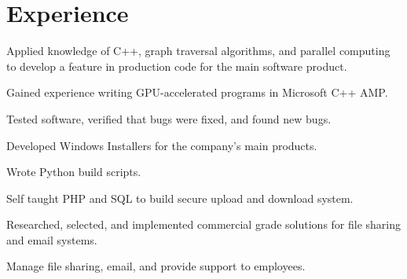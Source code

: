 \documentclass[letterpaper]{deedy-resume} %
\begin{document}
\begin{minipage}[t]{0.66\textwidth} %


\section{Experience}


\vspace{\topsep} %
\begin{tightitemize}
\item Applied knowledge of C++, graph traversal algorithms, and parallel
  computing to develop a feature in production code for the main software
  product.
\item Gained experience writing GPU-accelerated programs in Microsoft C++ AMP.
\item Tested software, verified that bugs were fixed, and found new bugs.
\item Developed Windows Installers for the company's main products.
\item Wrote Python build scripts.
\end{tightitemize}

\sectionspace %



\begin{tightitemize}
\item Self taught PHP and SQL to build secure upload and download system.
\item Researched, selected, and implemented commercial grade solutions
  for file sharing and email systems.
\item Manage file sharing, email, and provide support to employees.
\end{tightitemize}

\sectionspace %



\end{minipage}
\end{document}
